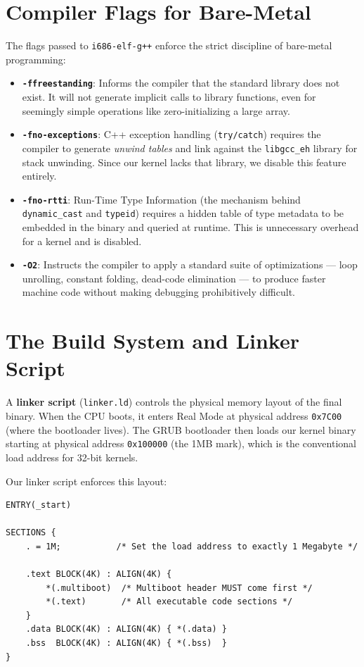 \documentclass[12pt,a4paper]{report}
\begin{document}
\section{Compiler Flags for Bare-Metal}

The flags passed to \texttt{i686-elf-g++} enforce the strict discipline of
bare-metal programming:

\begin{itemize}
    \item \textbf{\texttt{-ffreestanding}}: Informs the compiler that the standard
    library does not exist. It will not generate implicit calls to library functions,
    even for seemingly simple operations like zero-initializing a large array.
    \item \textbf{\texttt{-fno-exceptions}}: C++ exception handling (\texttt{try/catch})
    requires the compiler to generate \textit{unwind tables} and link against the
    \texttt{libgcc\_eh} library for stack unwinding. Since our kernel lacks that library,
    we disable this feature entirely.
    \item \textbf{\texttt{-fno-rtti}}: Run-Time Type Information (the mechanism behind
    \texttt{dynamic\_cast} and \texttt{typeid}) requires a hidden table of type metadata
    to be embedded in the binary and queried at runtime. This is unnecessary overhead
    for a kernel and is disabled.
    \item \textbf{\texttt{-O2}}: Instructs the compiler to apply a standard suite of
    optimizations --- loop unrolling, constant folding, dead-code elimination ---
    to produce faster machine code without making debugging prohibitively difficult.
\end{itemize}

\section{The Build System and Linker Script}

A \textbf{linker script} (\texttt{linker.ld}) controls the physical memory layout of
the final binary. When the CPU boots, it enters Real Mode at physical address
\texttt{0x7C00} (where the bootloader lives). The GRUB bootloader then loads our
kernel binary starting at physical address \texttt{0x100000} (the 1MB mark), which is
the conventional load address for 32-bit kernels.

Our linker script enforces this layout:
\begin{lstlisting}[title=linker.ld]
ENTRY(_start)

SECTIONS {
    . = 1M;           /* Set the load address to exactly 1 Megabyte */

    .text BLOCK(4K) : ALIGN(4K) {
        *(.multiboot)  /* Multiboot header MUST come first */
        *(.text)       /* All executable code sections */
    }
    .data BLOCK(4K) : ALIGN(4K) { *(.data) }
    .bss  BLOCK(4K) : ALIGN(4K) { *(.bss)  }
}
\end{lstlisting}
\end{document}
